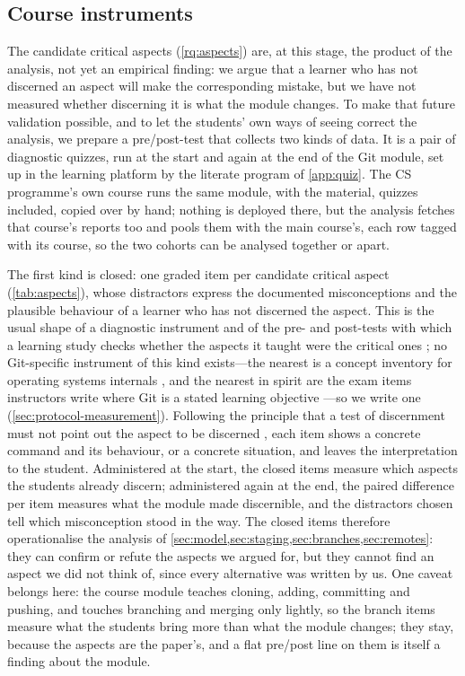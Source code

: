 \subsection{Course instruments}
\label{sec:method-instruments}

The candidate critical aspects (\cref{rq:aspects}) are, at this stage,
the product of the analysis, not yet an empirical finding: we argue that
a learner who has not discerned an aspect will make the corresponding
mistake, but we have not measured whether discerning it is what the
module changes.
To make that future validation possible, and to let the students' own
ways of seeing correct the analysis, we prepare a pre/post-test that
collects two kinds of data.
It is a pair of diagnostic quizzes, run at the start and again at the
end of the Git module, set up in the learning platform by the literate
program of \cref{app:quiz}.
The CS programme's own course runs the same module, with the material,
quizzes included, copied over by hand; nothing is deployed there, but
the analysis fetches that course's reports too and pools them with the
main course's, each row tagged with its course, so the two cohorts can
be analysed together or apart.

The first kind is closed: one graded item per candidate critical aspect
(\cref{tab:aspects}), whose distractors express the
documented misconceptions and the plausible behaviour of a learner who
has not discerned the aspect.
This is the usual shape of a diagnostic instrument
\autocite{KaltakciGurel2015Diagnostics} and of the pre- and post-tests
with which a learning study checks whether the aspects it taught were
the critical ones \autocite[Ch.~7]{NCOL}; no Git-specific instrument of
this kind exists---the nearest is a concept inventory for operating
systems internals \autocite{WebbTaylor2014OSCI}, and the nearest in
spirit are the exam items instructors write where Git is a stated
learning objective \autocite{Beckman2021GitLearningObjective}---so we
write one (\cref{sec:protocol-measurement}).
Following the principle that a test of discernment must not point out
the aspect to be discerned \autocite[p.~91]{NCOL}, each item shows a
concrete command and its behaviour, or a concrete situation, and leaves
the interpretation to the student.
Administered at the start, the closed items measure which aspects the
students already discern; administered again at the end, the paired
difference per item measures what the module made discernible, and the
distractors chosen tell which misconception stood in the way.
The closed items therefore operationalise the analysis of
\cref{sec:model,sec:staging,sec:branches,sec:remotes}: they can confirm
or refute the aspects we argued for, but they cannot find an aspect we
did not think of, since every alternative was written by us.
One caveat belongs here: the course module teaches cloning, adding,
committing and pushing, and touches branching and merging only lightly,
so the branch items measure what the students bring more than what the
module changes; they stay, because the aspects are the paper's, and a
flat pre/post line on them is itself a finding about the module.


